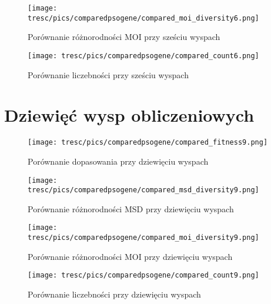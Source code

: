 \begin{figure}[H]
\begin{center} 
\texttt{[image: tresc/pics/comparedpsogene/compared\_moi\_diversity6.png]}
\caption{Porównanie różnorodności MOI przy sześciu wyspach}
\label{fig:compared_moi_diversity6}
\end{center}
\end{figure}

\begin{figure}[H]
\begin{center} 
\texttt{[image: tresc/pics/comparedpsogene/compared\_count6.png]}
\caption{Porównanie liczebności przy sześciu wyspach}
\label{fig:compared_count6}
\end{center}
\end{figure}


\section{Dziewięć wysp obliczeniowych}

\begin{figure}[H]
\begin{center} 
\texttt{[image: tresc/pics/comparedpsogene/compared\_fitness9.png]}
\caption{Porównanie dopasowania przy dziewięciu wyspach}
\label{fig:compared_fintess9}
\end{center}
\end{figure}

\begin{figure}[H]
\begin{center} 
\texttt{[image: tresc/pics/comparedpsogene/compared\_msd\_diversity9.png]}
\caption{Porównanie różnorodności MSD przy dziewięciu wyspach}
\label{fig:compared_msd_diversity9}
\end{center}
\end{figure}

\begin{figure}[H]
\begin{center} 
\texttt{[image: tresc/pics/comparedpsogene/compared\_moi\_diversity9.png]}
\caption{Porównanie różnorodności MOI przy dziewięciu wyspach}
\label{fig:compared_moi_diversity9}
\end{center}
\end{figure}

\begin{figure}[H]
\begin{center} 
\texttt{[image: tresc/pics/comparedpsogene/compared\_count9.png]}
\caption{Porównanie liczebności przy dziewięciu wyspach}
\label{fig:compared_count9}
\end{center}
\end{figure}


